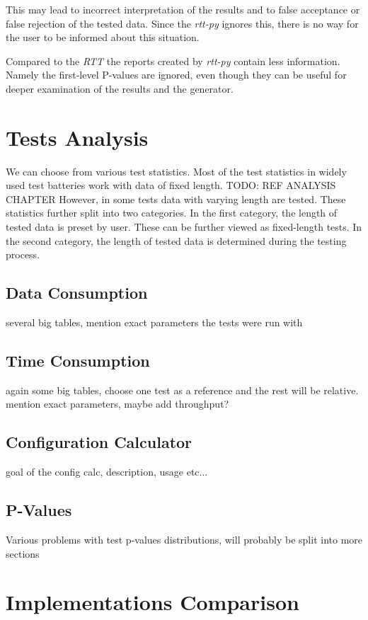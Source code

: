 \documentclass[
  digital,     %
  oneside,     %
  nosansbold,  %
  nocolorbold, %
  nolof,         %
  nolot,         %
]{fithesis4}
\begin{document}
This may lead to incorrect interpretation of the results and to false acceptance or false rejection of the tested data. Since the \emph{rtt-py} ignores this, there is no way for the user to be informed about this situation.

Compared to the \emph{RTT} the reports created by \emph{rtt-py} contain less information. Namely the first-level P-values are ignored, even though they can be useful for deeper examination of the results and the generator.



\chapter{Tests Analysis}
We can choose from various test statistics. Most of the test statistics in widely used test batteries work with data of fixed length. TODO: REF ANALYSIS CHAPTER However, in some tests data with varying length are tested. These statistics further split into two categories. In the first category, the length of tested data is preset by user. These can be further viewed as fixed-length tests. In the second category, the length of tested data is determined during the testing process. 
\section{Data Consumption}
several big tables, mention exact parameters the tests  were run with

\section{Time Consumption}
again some big tables, choose one test as a reference and the rest will be relative. mention exact parameters, maybe add throughput?
\section{Configuration Calculator}
goal of the config calc, description, usage etc...
\section{P-Values}
Various problems with test p-values distributions, will probably be split into more sections



\chapter{Implementations Comparison}
\end{document}
